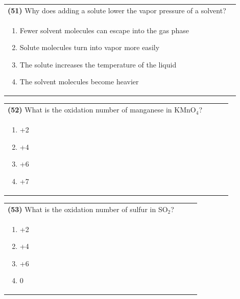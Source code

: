\documentclass{article}
\begin{document}
\noindent\begin{tabular}{|p{0.9\linewidth}|}
\hline
\textbf{(51)} Why does adding a solute lower the vapor pressure of a solvent?\\[0.2cm]
\begin{minipage}[t]{0.85\linewidth}
\begin{enumerate}[label=\alph*.]
\item Fewer solvent molecules can escape into the gas phase
\item Solute molecules turn into vapor more easily
\item The solute increases the temperature of the liquid
\item The solvent molecules become heavier
\end{enumerate}
\end{minipage}\\[0.2cm]
\hline
\end{tabular}

\noindent\begin{tabular}{|p{0.9\linewidth}|}
\hline
\textbf{(52)} What is the oxidation number of manganese in KMnO$_4$?\\[0.2cm]
\begin{minipage}[t]{0.85\linewidth}
\begin{enumerate}[label=\alph*.]
\item +2
\item +4
\item +6
\item +7
\end{enumerate}
\end{minipage}\\[0.2cm]
\hline
\end{tabular}
\newpage

\noindent\begin{tabular}{|p{0.9\linewidth}|}
\hline
\textbf{(53)} What is the oxidation number of sulfur in SO$_2$?\\[0.2cm]
\begin{minipage}[t]{0.85\linewidth}
\begin{enumerate}[label=\alph*.]
\item +2
\item +4
\item +6
\item 0
\end{enumerate}
\end{minipage}\\[0.2cm]
\hline
\end{tabular}
\end{document}
